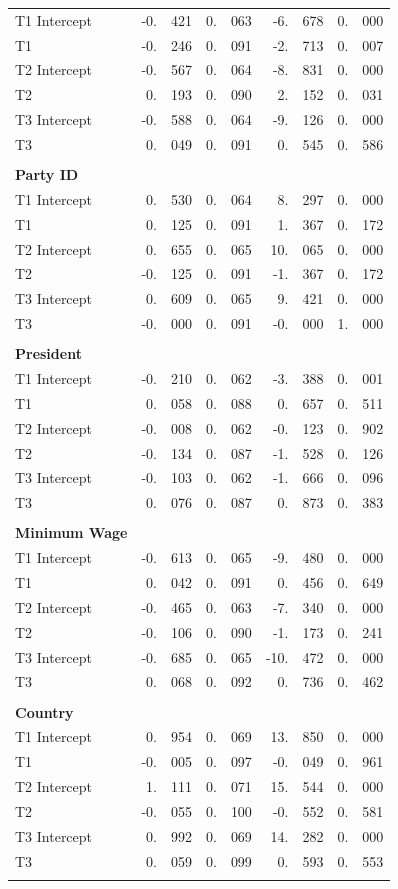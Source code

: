 \documentclass[12pt,econ]{sources/authesis}
\begin{document}
\begin{longtable}{lr@{}lr@{}lr@{}lr@{}l}
 T1 Intercept & -0.&421 & 0.&063 & -6.&678 & 0.&000 \\
 T1 & -0.&246 & 0.&091 & -2.&713 & 0.&007 \\
 T2 Intercept & -0.&567 & 0.&064 & -8.&831 & 0.&000 \\
 T2 & 0.&193 & 0.&090 & 2.&152 & 0.&031 \\
 T3 Intercept & -0.&588 & 0.&064 & -9.&126 & 0.&000 \\ 
 T3 & 0.&049 & 0.&091 & 0.&545 & 0.&586 \\ 
 & & & & \\  
  \textbf{Party ID} & & & & \\  
 T1 Intercept & 0.&530 & 0.&064 & 8.&297 & 0.&000 \\
 T1 & 0.&125 & 0.&091 & 1.&367 & 0.&172 \\
 T2 Intercept & 0.&655 & 0.&065 & 10.&065 & 0.&000 \\
 T2 & -0.&125 & 0.&091 & -1.&367 & 0.&172 \\
 T3 Intercept & 0.&609 & 0.&065 & 9.&421 & 0.&000 \\ 
 T3 & -0.&000 & 0.&091 & -0.&000 & 1.&000 \\ 
 & & & & \\  
\textbf{President} & & & & \\  
 T1 Intercept & -0.&210 & 0.&062 & -3.&388 & 0.&001 \\ 
 T1 & 0.&058 & 0.&088 & 0.&657 & 0.&511 \\ 
 T2 Intercept & -0.&008 & 0.&062 & -0.&123 & 0.&902 \\ 
 T2 & -0.&134 & 0.&087 & -1.&528 & 0.&126 \\ 
 T3 Intercept & -0.&103 & 0.&062 & -1.&666 & 0.&096 \\
 T3 & 0.&076 & 0.&087 & 0.&873 & 0.&383 \\ 
 & & & & \\  
\textbf{Minimum Wage} & & & & \\  
 T1 Intercept & -0.&613 & 0.&065 & -9.&480 & 0.&000 \\ 
 T1 & 0.&042 & 0.&091 & 0.&456 & 0.&649 \\ 
 T2 Intercept & -0.&465 & 0.&063 & -7.&340 & 0.&000 \\
 T2 & -0.&106 & 0.&090 & -1.&173 & 0.&241 \\
 T3 Intercept & -0.&685 & 0.&065 & -10.&472 & 0.&000 \\ 
 T3 & 0.&068 & 0.&092 & 0.&736 & 0.&462 \\
 & & & & \\  
\textbf{Country} & & & & \\  
 T1 Intercept & 0.&954 & 0.&069 & 13.&850 & 0.&000 \\ 
 T1 & -0.&005 & 0.&097 & -0.&049 & 0.&961 \\ 
 T2 Intercept & 1.&111 & 0.&071 & 15.&544 & 0.&000 \\ 
 T2 & -0.&055 & 0.&100 & -0.&552 & 0.&581 \\ 
 T3 Intercept & 0.&992 & 0.&069 & 14.&282 & 0.&000 \\
 T3 & 0.&059 & 0.&099 & 0.&593 & 0.&553 \\ 
 \hline \\[-1.8ex]
 \end{longtable}
\end{document}
